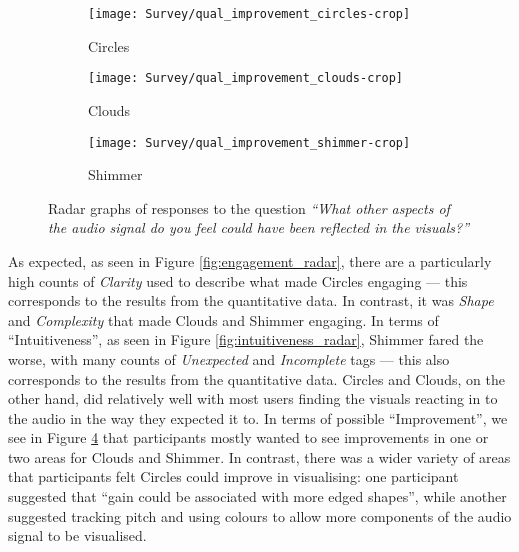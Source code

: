 \documentclass[../initial_thesis.tex]{subfiles}
\begin{document}
\begin{figure}
  \begin{subfigure}{0.32\textwidth}
    \centering
    \texttt{[image: Survey/qual\_improvement\_circles-crop]}
    \caption{Circles}
    \label{fig:improvement_circles}
  \end{subfigure}
  \begin{subfigure}{0.32\textwidth}
    \centering
    \texttt{[image: Survey/qual\_improvement\_clouds-crop]}
    \caption{Clouds}
    \label{fig:improvement_clouds}
  \end{subfigure}
  \begin{subfigure}{0.32\textwidth}
    \centering
    \texttt{[image: Survey/qual\_improvement\_shimmer-crop]}
    \caption{Shimmer}
    \label{fig:improvement_shimmer}
  \end{subfigure}
  \caption{Radar graphs of responses to the question \textit{``What other aspects of the audio signal do you feel could have been reflected in the visuals?''}}
  \label{fig:improvement_radar}
\end{figure}

As expected, as seen in Figure \ref{fig:engagement_radar}, there are a particularly high counts of \emph{Clarity} used to describe what made Circles engaging --- this corresponds to the results from the quantitative data. In contrast, it was \emph{Shape} and \emph{Complexity} that made Clouds and Shimmer engaging. In terms of ``Intuitiveness'', as seen in Figure \ref{fig:intuitiveness_radar}, Shimmer fared the worse, with many counts of \emph{Unexpected} and \emph{Incomplete} tags --- this also corresponds to the results from the quantitative data. Circles and Clouds, on the other hand, did relatively well with most users finding the visuals reacting in to the audio in the way they expected it to. In terms of possible ``Improvement'', we see in Figure \ref{fig:improvement_radar} that participants mostly wanted to see improvements in one or two areas for Clouds and Shimmer. In contrast, there was a wider variety of areas that participants felt Circles could improve in visualising: one participant suggested that ``gain could be associated with more edged shapes'', while another suggested tracking pitch and using colours to allow more components of the audio signal to be visualised. \par
\end{document}
